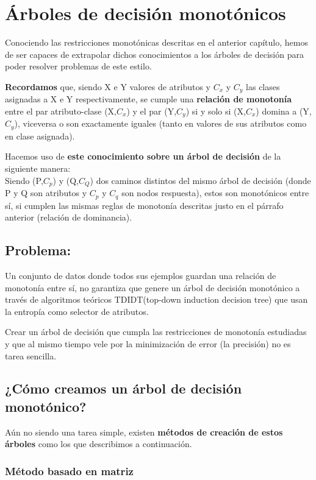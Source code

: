 \section{Árboles de decisión monotónicos}

Conociendo las restricciones monotónicas descritas en el anterior capítulo, hemos de ser capaces de extrapolar dichos conocimientos a los árboles de decisión para poder resolver problemas de este estilo.

\textbf{Recordamos} que, siendo X e Y valores de atributos y $C_x$ y $C_y$ las clases asignadas a X e Y respectivamente, se cumple una \textbf{relación de monotonía} entre el par atributo-clase (X,$C_x$) y el par (Y,$C_y$) si y solo si (X,$C_x$) domina a (Y,$C_y$), viceversa o son exactamente iguales (tanto en valores de sus atributos como en clase asignada).

Hacemos uso de \textbf{este conocimiento sobre un árbol de decisión} de la siguiente manera:\\
Siendo (P,$C_p$) y (Q,$C_Q$) dos caminos distintos del mismo árbol de decisión (donde P y Q son atributos y $C_p$ y $C_q$ son nodos respuesta), estos son monotónicos entre sí, si cumplen las mismas reglas de monotonía descritas justo en el párrafo anterior (relación de dominancia).\cite{ref14}

\subsection{Problema:}
Un conjunto de datos donde todos sus ejemplos guardan una relación de monotonía entre sí, no garantiza que genere un árbol de decisión monotónico a través de algoritmos teóricos TDIDT(top-down induction decision tree) que usan la entropía como selector de atributos.

Crear un árbol de decisión que cumpla las restricciones de monotonía estudiadas y que al mismo tiempo vele por la minimización de error (la precisión) no es tarea sencilla. 

\subsection{¿Cómo creamos un árbol de decisión monotónico?}

Aún no siendo una tarea simple, existen \textbf{métodos de creación de estos árboles} como los que describimos a continuación.

\subsubsection{Método basado en matriz}

